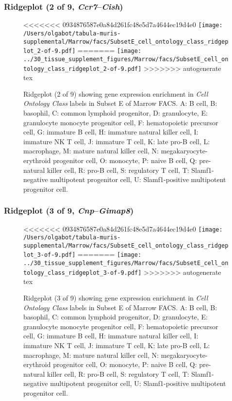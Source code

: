 \clearpage

\subsubsection{Ridgeplot (2 of 9, \emph{Ccr7}--\emph{Cish})}
\begin{figure}[h]
\centering
<<<<<<< 0934876587e0a84d261fc48e5d7a4644ec19d4e0
\texttt{[image: /Users/olgabot/tabula-muris-supplemental/Marrow/facs/SubsetE\_cell\_ontology\_class\_ridgeplot\_2-of-9.pdf]}
=======
\texttt{[image: ../30\_tissue\_supplement\_figures/Marrow/facs/SubsetE\_cell\_ontology\_class\_ridgeplot\_2-of-9.pdf]}
>>>>>>> autogenerate tex

\caption{ Ridgeplot (2 of 9)  showing gene expression enrichment in \emph{Cell Ontology Class} labels in Subset E of Marrow FACS. A: B cell, B: basophil, C: common lymphoid progenitor, D: granulocyte, E: granulocyte monocyte progenitor cell, F: hematopoietic precursor cell, G: immature B cell, H: immature natural killer cell, I: immature NK T cell, J: immature T cell, K: late pro-B cell, L: macrophage, M: mature natural killer cell, N: megakaryocyte-erythroid progenitor cell, O: monocyte, P: naive B cell, Q: pre-natural killer cell, R: pro-B cell, S: regulatory T cell, T: Slamf1-negative multipotent progenitor cell, U: Slamf1-positive multipotent progenitor cell.}
\end{figure}


\clearpage

\subsubsection{Ridgeplot (3 of 9, \emph{Cnp}--\emph{Gimap8})}
\begin{figure}[h]
\centering
<<<<<<< 0934876587e0a84d261fc48e5d7a4644ec19d4e0
\texttt{[image: /Users/olgabot/tabula-muris-supplemental/Marrow/facs/SubsetE\_cell\_ontology\_class\_ridgeplot\_3-of-9.pdf]}
=======
\texttt{[image: ../30\_tissue\_supplement\_figures/Marrow/facs/SubsetE\_cell\_ontology\_class\_ridgeplot\_3-of-9.pdf]}
>>>>>>> autogenerate tex

\caption{ Ridgeplot (3 of 9)  showing gene expression enrichment in \emph{Cell Ontology Class} labels in Subset E of Marrow FACS. A: B cell, B: basophil, C: common lymphoid progenitor, D: granulocyte, E: granulocyte monocyte progenitor cell, F: hematopoietic precursor cell, G: immature B cell, H: immature natural killer cell, I: immature NK T cell, J: immature T cell, K: late pro-B cell, L: macrophage, M: mature natural killer cell, N: megakaryocyte-erythroid progenitor cell, O: monocyte, P: naive B cell, Q: pre-natural killer cell, R: pro-B cell, S: regulatory T cell, T: Slamf1-negative multipotent progenitor cell, U: Slamf1-positive multipotent progenitor cell.}
\end{figure}


